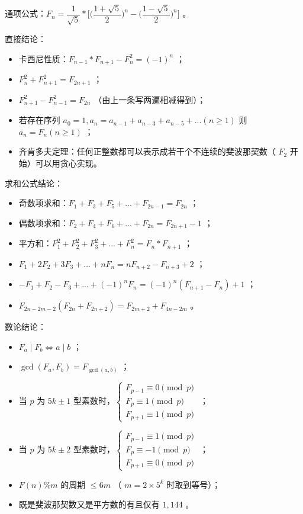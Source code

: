 通项公式：$F_n=\dfrac{1}{\sqrt 5}*  \Big[ \Big( \dfrac{1+\sqrt 5}{2} \Big)^n - \Big( \dfrac{1-\sqrt 5}{2} \Big)^n \Big]$ 。

直接结论：
\begin{itemize}
    \item 卡西尼性质：$F_{n-1} * F_{n+1}-F_n^2=(-1)^n$ ；
    \item $F_{n}^2+F_{n+1}^2=F_{2n+1}$ ；
    \item $F_{n+1}^2-F_{n-1}^2=F_{2n}$ （由上一条写两遍相减得到）；
    \item 若存在序列 $a_0=1,a_n=a_{n-1}+a_{n-3}+a_{n-5}+...(n\ge 1)$ 则 $a_n=F_n(n\ge 1)$ ；
    \item 齐肯多夫定理：任何正整数都可以表示成若干个不连续的斐波那契数（ $F_2$ 开始）可以用贪心实现。
\end{itemize}

求和公式结论：
\begin{itemize}
    \item 奇数项求和：$F_1+F_3+F_5+...+F_{2n-1}=F_{2n}$ ；
    \item 偶数项求和：$F_2+F_4+F_6+...+F_{2n}=F_{2n+1}-1$ ；
    \item 平方和：$F_1^2+F_2^2+F_3^2+...+F_n^2=F_n*F_{n+1}$ ；
    \item $F_1+2F_2+3F_3+...+nF_n=nF_{n+2}-F_{n+3}+2$ ；
    \item $-F_1+F_2-F_3+...+(-1)^nF_n=(-1)^n(F_{n+1}-F_n)+1$ ；
    \item $F_{2n-2m-2}(F_{2n}+F_{2n+2})=F_{2m+2}+F_{4n-2m}$ 。
\end{itemize}

数论结论：
\begin{itemize}
    \item $F_a \mid F_b \Leftrightarrow a \mid b$ ；
    \item $\gcd(F_a,F_b)=F_{\gcd(a,b)}$ ；
    \item 当 $p$ 为 $5k\pm 1$ 型素数时，$\begin{cases} F_{p-1}\equiv 0\pmod p \\ F_p\equiv 1\pmod p \\ F_{p+1}\equiv 1\pmod p \end{cases}$ ；
    \item 当 $p$ 为 $5k\pm 2$ 型素数时，$\begin{cases} F_{p-1}\equiv 1\pmod p \\ F_p\equiv -1\pmod p \\ F_{p+1}\equiv 0\pmod p \end{cases}$ ；
    \item $F(n)\%m$ 的周期 $\le 6m$ （ $m=2\times 5^k$ 时取到等号）；
    \item 既是斐波那契数又是平方数的有且仅有 $1,144$ 。
\end{itemize}